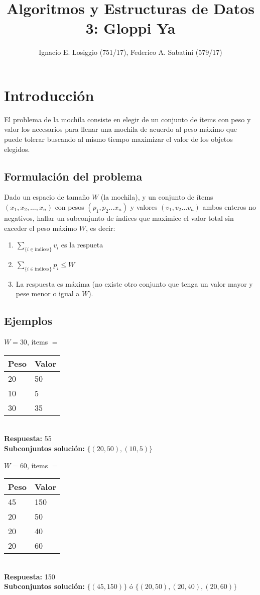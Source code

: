 \documentclass[fleqn, 11pt]{article}
\title{Algoritmos y Estructuras de Datos 3: Gloppi Ya}
\author{Ignacio E. Losiggio (751/17), Federico A. Sabatini (579/17)}
\begin{document}
\maketitle

\tableofcontents

\section{Introducción}

El problema de la mochila consiste en elegir de un conjunto de ítems con peso y
valor los necesarios para llenar una mochila de acuerdo al peso máximo que
puede tolerar buscando al mismo tiempo maximizar el valor de los objetos
elegidos.

\subsection{Formulación del problema}

Dado un espacio de tamaño $W$ (la mochila), y un conjunto de ítems $(x_1, x_2,
\dots, x_n)$ con pesos $(p_1, p_2 \dots x_n)$ y valores $(v_1, v_2 \dots v_n)$
ambos enteros no negativos, hallar un subconjunto de índices que maximice el
valor total sin exceder el peso máximo $W$, es decir:

\begin{enumerate}
	\item $\sum_{\{i \in \text{índices}\}} v_i$ es la respueta
	\item $\sum_{\{i \in \text{índices}\}} p_i \le W$
	\item La respuesta es máxima (no existe otro conjunto que tenga un
	valor mayor y  pese menor o igual a $W$).
\end{enumerate}

\subsection{Ejemplos}

$W = 30$, ítems $=$
\begin{tabular}{l l}
	Peso  & Valor \\ \toprule
	20 & 50 \\
	10 & 5  \\
	30 & 35
\end{tabular} \\
\textbf{Respuesta:} 55 \\
\textbf{Subconjuntos solución:} $\{(20,50), (10,5)\}$

$W = 60$, ítems $=$
\begin{tabular}{l l}
	Peso & Valor \\ \toprule
	45 & 150 \\
	20 & 50 \\
	20 & 40 \\
	20 & 60
\end{tabular} \\
\textbf{Respuesta:} 150 \\
\textbf{Subconjuntos solución:} $\{(45, 150)\}$ ó $\{(20, 50), (20, 40), (20,
60)\}$
\end{document}
